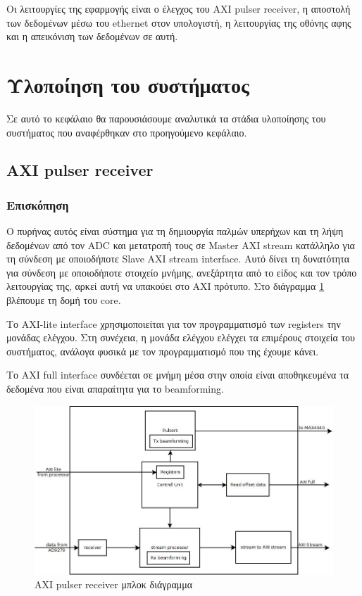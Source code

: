 \documentclass[12pt,a4paper]{book}
\begin{document}
Οι λειτουργίες της εφαρμογής είναι ο έλεγχος του AXI pulser receiver, η αποστολή των δεδομένων μέσω του ethernet στον υπολογιστή, η λειτουργίας της οθόνης αφης και η απεικόνιση των δεδομένων σε αυτή.


\section{Υλοποίηση του συστήματος}

Σε αυτό το κεφάλαιο θα παρουσιάσουμε αναλυτικά τα στάδια υλοποίησης του συστήματος που αναφέρθηκαν στο προηγούμενο κεφάλαιο. 

\subsection{AXI pulser receiver}

\subsubsection{Επισκόπηση}
Ο πυρήνας αυτός είναι σύστημα για τη δημιουργία παλμών υπερήχων και τη λήψη δεδομένων από τον ADC και μετατροπή τους σε Master AXI stream κατάλληλο για τη σύνδεση με οποιοδήποτε Slave AXI stream interface. Αυτό δίνει τη δυνατότητα για σύνδεση με οποιοδήποτε στοιχείο μνήμης, ανεξάρτητα από το είδος και τον τρόπο λειτουργίας της, αρκεί αυτή να υπακούει στο AXI πρότυπο. Στο διάγραμμα \ref{axi_pr_block} βλέπουμε τη δομή του core.

Το AXI-lite interface χρησιμοποιείται για τον προγραμματισμό των registers την μονάδας ελέγχου. Στη συνέχεια, η μονάδα ελέγχου ελέγχει τα επιμέρους στοιχεία του συστήματος, ανάλογα φυσικά με τον προγραμματισμό που της έχουμε κάνει.

Το AXI full interface συνδέεται σε μνήμη μέσα στην οποία είναι αποθηκευμένα τα δεδομένα που είναι απαραίτητα για το beamforming.

\begin{figure}
	\centering
	\includegraphics[width=\textwidth]{axi_pr_block}
	\caption{AXI pulser receiver μπλοκ διάγραμμα}
	\label{axi_pr_block}
\end{figure}
\end{document}
